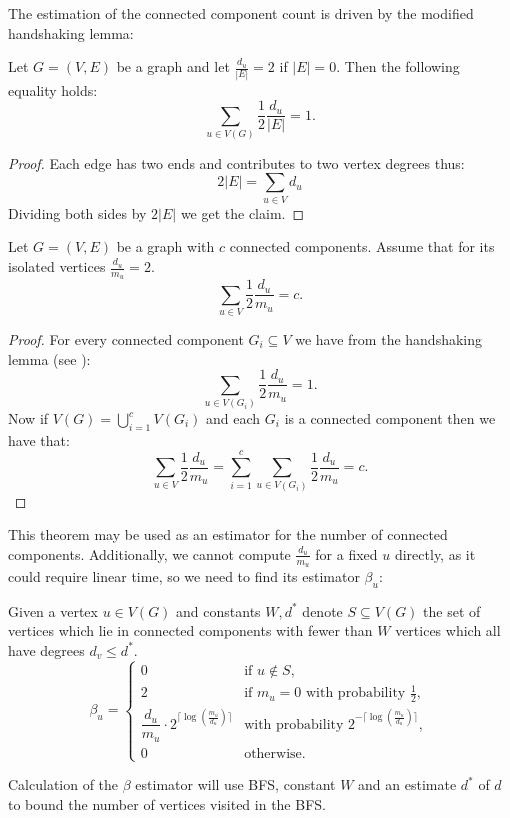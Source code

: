 The estimation of the connected component count is driven by the modified handshaking lemma:
\begin{lemma}
    Let $G = (V, E)$ be a graph and let $\frac{d_u}{|E|} = 2$ if $|E| = 0$. Then the following equality holds:
    \begin{equation*}
    \sum\limits_{u \in V(G)}\frac12 \frac{d_u}{|E|} = 1.
    \end{equation*}
    \label{hand}
\end{lemma}
\begin{proof}
    Each edge has two ends and contributes to two vertex degrees thus:
    \begin{equation*}
        2|E| = \sum\limits_{u\in V}d_u
    \end{equation*}
    Dividing both sides by $2|E|$ we get the claim.
\end{proof}
\begin{theorem}
\label{mg}
    Let $G = (V, E)$ be a graph with $c$ connected components. Assume that for its isolated vertices $\frac{d_u}{m_u} = 2$. 
    \begin{equation}
    \sum\limits_{u \in V}\frac12 \frac{d_u}{m_u} = c.
    \end{equation} 
\end{theorem}
\begin{proof}
     For every connected component $G_i \subseteq V$ we have from the handshaking lemma (see ):
    \begin{equation*}
    \sum\limits_{u \in V(G_i)}\frac12 \frac{d_u}{m_u} = 1.
    \end{equation*}
     Now if $V(G) = \bigcup\limits_{i=1}^cV(G_i)$ and each $G_i$ is a connected component then we have that:
     \begin{equation*}
     \sum\limits_{u \in V}\frac12 \frac{d_u}{m_u} = \sum\limits_{i = 1}^c\sum\limits_{u \in V(G_i)}\frac12 \frac{d_u}{m_u} = c.
     \end{equation*}
\end{proof}
This theorem may be used as an estimator for the number of connected components. Additionally, we cannot compute $\frac{d_u}{m_u}$ for a fixed $u$ directly, as it could require linear time, so we need to find its estimator $\beta_u$:
\begin{definition}
Given a vertex $u \in V(G)$ and constants $W, d^*$ denote $S\subseteq V(G)$ the set of vertices which lie in connected components with fewer than $W$ vertices which all have degrees $d_v \leq d^*$. 
\[
\beta_u =
\begin{cases}
0 & \text{if } u \notin S, \\
2 & \text{if } m_u = 0 \text{ with probability } \tfrac{1}{2}, \\
\dfrac{d_u}{m_u} \cdot 2^{\lceil \log(\tfrac{m_u}{d_u}) \rceil} 
  & \text{with probability } 2^{-\lceil \log(\tfrac{m_u}{d_u}) \rceil}, \\
0 & \text{otherwise.}
\end{cases}
\]
\end{definition}
 Calculation of the $\beta$ estimator will use BFS, constant $W$ and an estimate $d^*$ of $d$ to bound the number of vertices visited in the BFS. 

